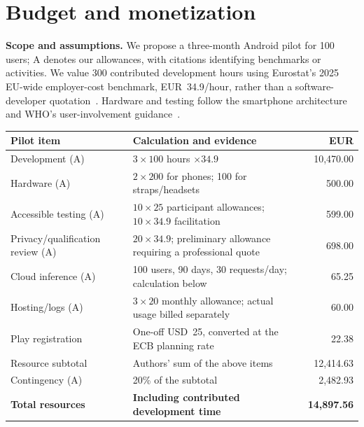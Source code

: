 \documentclass[10pt,twoside,english,a4paper]{article}
\begin{document}
\clearpage
\section*{Budget and monetization}

\textbf{Scope and assumptions.} We propose a three-month Android pilot for 100 users; A denotes our allowances, with citations identifying benchmarks or activities. We value 300 contributed development hours using Eurostat's 2025 EU-wide employer-cost benchmark, EUR~34.9/hour, rather than a software-developer quotation~\cite{eurolabour2025}. Hardware and testing follow the smartphone architecture and WHO's user-involvement guidance~\cite{androidcamerax,whotechnology2024}.

\begin{center}
\small
\renewcommand{\arraystretch}{1.12}
\begin{tabular}{@{}p{3.3cm}p{6.3cm}r@{}}
\hline
\raggedright \textbf{Pilot item} & \raggedright \textbf{Calculation and evidence} &  \textbf{EUR} \tabularnewline
\hline
\raggedright Development (A) & \raggedright $3\times100$ hours $\times34.9$~\cite{eurolabour2025} &  10,470.00 \tabularnewline
\raggedright Hardware (A) & \raggedright $2\times200$ for phones; 100 for straps/headsets~\cite{androidcamerax} &  500.00 \tabularnewline
\raggedright Accessible testing (A) & \raggedright $10\times25$ participant allowances; $10\times34.9$ facilitation~\cite{whotechnology2024,eurolabour2025} &  599.00 \tabularnewline
\raggedright Privacy/qualification review (A) & \raggedright $20\times34.9$; preliminary allowance requiring a professional quote~\cite{gdpr,mdcg2019software,eurolabour2025} &  698.00 \tabularnewline
\raggedright Cloud inference (A) & \raggedright 100 users, 90 days, 30 requests/day; calculation below~\cite{geminipricing2026,ecbrate20261030} &  65.25 \tabularnewline
\raggedright Hosting/logs (A) & \raggedright $3\times20$ monthly allowance; actual usage billed separately~\cite{cloudrunpricing2026} &  60.00 \tabularnewline
\raggedright Play registration & \raggedright One-off USD~25, converted at the ECB planning rate~\cite{playregistration2026,ecbrate20261030} &  22.38 \tabularnewline
\hline
\raggedright Resource subtotal & \raggedright Authors' sum of the above items &  12,414.63 \tabularnewline
\raggedright Contingency (A) & \raggedright 20\% of the subtotal &  2,482.93 \tabularnewline
\raggedright \textbf{Total resources} & \raggedright \textbf{Including contributed development time} &  \textbf{14,897.56} \tabularnewline
\hline
\end{tabular}
\end{center}
\end{document}
